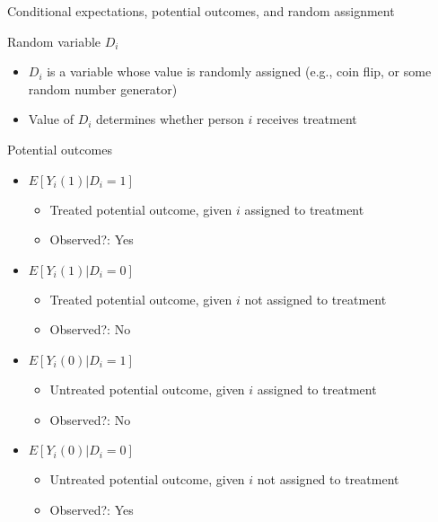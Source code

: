 \begin{frame}[shrink=10]{Conditional expectations, potential outcomes, and random assignment}

	Random variable $ D_i $
	\begin{itemize}
		\item $ D_i $ is a variable whose value is randomly assigned (e.g., coin flip, or some random number generator)
		\item Value of $ D_i $ determines whether person $i$ receives treatment
	\end{itemize}
	\vspace{3mm}	
	Potential outcomes
	\begin{itemize}
		\item $ E[Y_i(1)|D_i=1]$
		\begin{itemize}
			\item Treated potential outcome, given $i$ assigned to treatment
			\item Observed?: Yes 
		\end{itemize}	
		\item $ E[Y_i(1)|D_i=0]$
		\begin{itemize}
			\item Treated potential outcome, given $i$ not assigned to treatment
			\item Observed?: No 			
		\end{itemize}		 
		\item $ E[Y_i(0)|D_i=1]$
		\begin{itemize}
			\item Untreated potential outcome, given $i$ assigned to treatment
			\item Observed?: No		
		\end{itemize}		 
		\item $ E[Y_i(0)|D_i=0]$
		\begin{itemize}
			\item Untreated potential outcome, given $i$ not assigned to treatment
			\item Observed?: Yes		
		\end{itemize}		 
			 
	\end{itemize}		
\end{frame}

